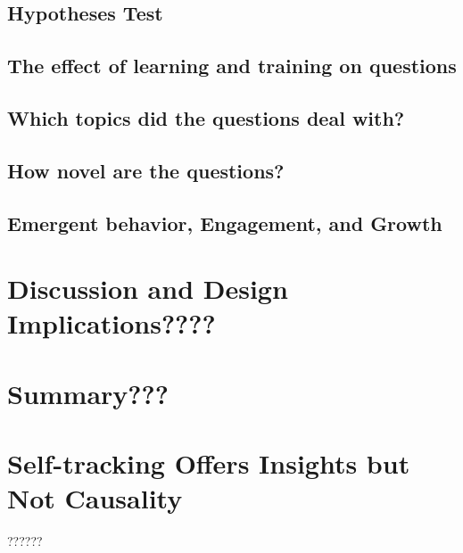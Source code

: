  \subsection{Hypotheses Test}
 \subsection{The effect of learning and training on questions}
 \subsection{Which topics did the questions deal with?}
 \subsection{How novel are the questions?}
 \subsection{Emergent behavior, Engagement, and Growth}

\section{Discussion and Design Implications????}
\section{Summary???}

\section{Self-tracking Offers Insights but Not Causality}
??????

